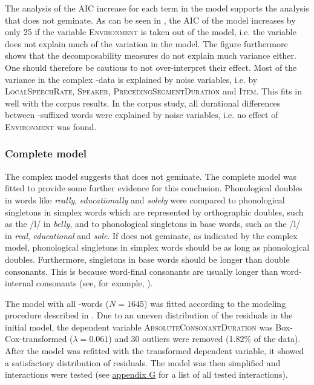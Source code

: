 The analysis of the AIC increase for each term in the model supports the analysis that  does not geminate. As can be seen in , the AIC of the model increases by only 25 if the variable \textsc{Environment} is taken out of the model, i.e. the variable does not explain much of the variation in the model.
The figure furthermore shows that the decomposability measures do not explain much variance either. One should therefore be cautious to not over-interpret their effect. 
Most of the variance in the complex -data is explained by noise variables, i.e. by \textsc{LocalSpeechRate}, \textsc{Speaker}, \textsc{PrecedingSegmentDuration} and \textsc{Item}. This fits in well with the corpus results. In the corpus study, all durational differences between -suffixed words were explained by noise variables, i.e. no effect of \textsc{Environment} was found.




\subsubsection{Complete model}

The complex model suggests that  does not geminate. The complete model was fitted to provide some further evidence for this conclusion. Phonological doubles in words like \textit{really}, \textit{educationally} and \textit{solely} were compared to phonological singletons in simplex words which are represented by orthographic doubles, such as the /l/ in \textit{belly}, and to phonological singletons in base words, such as the /l/ in \textit{real}, \textit{educational} and \textit{sole}. 
If  does not geminate, as indicated by the complex model, phonological singletons in simplex words should be as long as phonological doubles. Furthermore, singletons in base words should be longer than double consonants. This is because word-final consonants are usually longer than word-internal consonants (see, for example,  \citealt{Berkovits.1993,Oller.1973,Umeda.1977}). 


The model with all -words ($N=1645$) was fitted according to the modeling procedure described in . Due to an uneven distribution of the residuals in the initial model, the dependent variable \textsc{AbsoluteConsonantDuration} was Box-Cox-transformed ($\lambda = 0.061$) and 30 outliers were removed (1.82\% of the data).
After the model was refitted with the transformed dependent variable, it showed a satisfactory distribution of residuals.  The model was then simplified and interactions were tested (see \hyperref[Appendix G Summaries of tested interactions in experimental study]{appendix G} for a list of all tested interactions).



